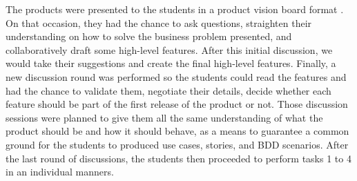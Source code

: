 %

The products were presented to the students in a product vision board format \cite{VisionBoard}. On that occasion, they had the chance to ask questions, straighten their understanding on how to solve the business problem presented, and collaboratively draft some high-level features. After this initial discussion, we would take their suggestions and create the final high-level features. Finally, a new discussion round was performed so the students could read the features and had the chance to validate them, negotiate their details, decide whether each feature should be part of the first release of the product or not. Those discussion sessions were planned to give them all the same understanding of what the product should be and how it should behave, as a means to guarantee a common ground for the students to produced use cases, stories, and BDD scenarios. After the last round of discussions, the students then proceeded to perform tasks 1 to 4 in an individual manners.   

